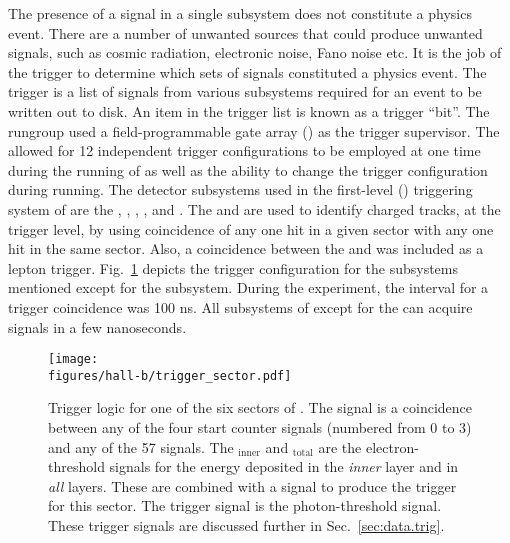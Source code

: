 The presence of a signal in a single subsystem does not constitute a physics event. There are a number of unwanted sources that could produce unwanted signals, such as cosmic radiation, electronic noise, Fano noise etc. It is the job of the trigger to determine which sets of signals constituted a physics event. The trigger is a list of signals from various subsystems required for an event to be written out to disk. An item in the trigger list is known as a trigger ``bit''. The  rungroup used a field-programmable gate array () as the trigger supervisor. The  allowed for 12 independent trigger configurations to be employed at one time during the running of  as well as the ability to change the trigger configuration during running. The detector subsystems used in the first-level () triggering system of  are the , ,  , , and . The  and  are used to identify charged tracks, at the trigger level, by using coincidence of any one  hit in a given sector with any one  hit in the same sector. Also, a coincidence between the  and  was included as a lepton trigger. Fig.~\ref{fig:clas.daq.trigsec} depicts the  trigger configuration for the subsystems mentioned except for the  subsystem. During the  experiment, the interval for a trigger coincidence was 100 ns. All subsystems of \clas except for the  can acquire signals in a few nanoseconds.
\begin{figure}[h]\begin{center}
		\texttt{[image: \\figures/hall-b/trigger\_sector.pdf]}
		\caption[Trigger logic for one of the six sectors of ]{\label{fig:clas.daq.trigsec}{}Trigger logic for one of the six sectors of . The  signal is a coincidence between any of the four start counter  signals (numbered from 0 to 3) and any of the 57   signals. The $_\mathrm{inner}$ and $_{\mathrm{total}}$ are the electron-threshold  signals for the energy deposited in the \emph{inner} layer and in \emph{all} layers. These are combined with a  signal to produce the  trigger for this sector. The  trigger signal is the photon-threshold  signal. These trigger signals are discussed further in Sec.~\ref{sec:data.trig}.}
	\end{center}\end{figure}
	

